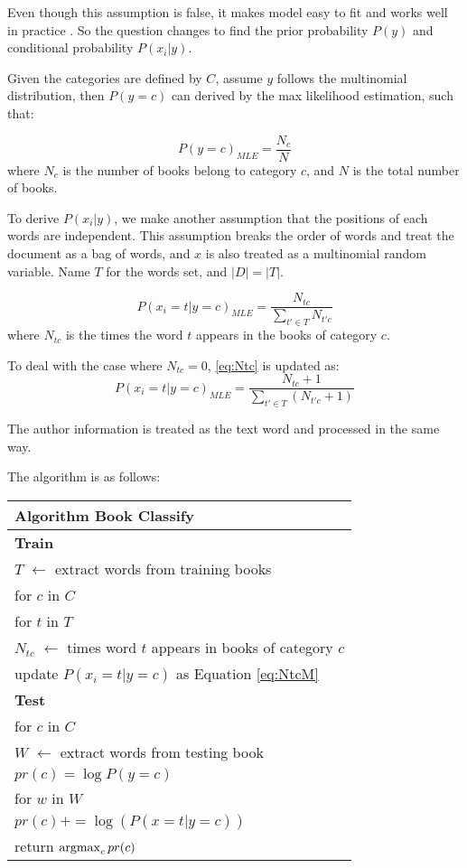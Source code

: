 \documentclass{article}
\newcommand{\mind}{{\hspace{0.6cm}}}
\newcommand{\argmax}{\operatornamewithlimits{argmax}}
\begin{document}
Even though this assumption is false, it makes model easy to fit and works well in practice \cite{Murphy2006}.
So the question changes to find the prior probability $P(y)$ and conditional probability $P(x_i|y)$.

Given the categories are defined by $C$, assume $y$ follows the multinomial distribution, then $P(y=c)$ can derived by the max likelihood estimation, such that:

\begin{equation}
P(y=c)_{MLE} = \frac{N_c}{N}
\end{equation}
where $N_c$ is the number of books belong to category $c$, and $N$ is the total number of books.

To derive $P(x_i|y)$, we make another assumption that the positions of each words are independent.
This assumption breaks the order of words and treat the document as a bag of words, and $x$ is also treated as a multinomial random variable.
Name $T$ for the words set, and $|D|=|T|$.

\begin{equation}
\label{eq:Ntc}
P(x_i=t|y=c)_{MLE}=\frac{N_{tc}}{\sum\limits_{t' \in T} N_{t'c}}
\end{equation}
where $N_{tc}$ is the times the word $t$ appears in the books of category $c$.

To deal with the case where $N_{tc}=0$, \ref{eq:Ntc} is updated as:
\begin{equation}
\label{eq:NtcM}
P(x_i=t|y=c)_{MLE}=\frac{N_{tc}+1}{\sum\limits_{t' \in T} (N_{t'c}+1)}
\end{equation}

The author information is treated as the text word and processed in the same way.

The algorithm is as follows:
\begin{table}[htb]
\centering
\begin{tabular}{l}
\hline         
\textbf{Algorithm } Book Classify \\ \hline \hline
	 \bf{Train} \\
	 $T$ $\leftarrow$ extract words from training books \\
	 for $c$ in $C$  \\
	   \mind for $t$ in $T$                          \\
	     \mind \mind $N_{tc}$ $\leftarrow$ times word $t$ appears in books of category $c$  \\
	 	 \mind \mind update $P(x_i=t|y=c)$ as Equation \ref{eq:NtcM} \\
	 	 
	 \bf{Test} \\
	 for $c$ in $C$  \\
	 	\mind $W$ $\leftarrow$ extract words from testing book \\
	 	\mind $pr(c)=\log P(y=c)$ \\
	 	\mind for $w$ in $W$ \\
	 	\mind \mind $pr(c) += \log(P(x=t|y=c))$       \\
	 return $\argmax_c pr(c)$  \\
    \end{tabular}
    \label{tab:alg}
\end{table}
\end{document}

